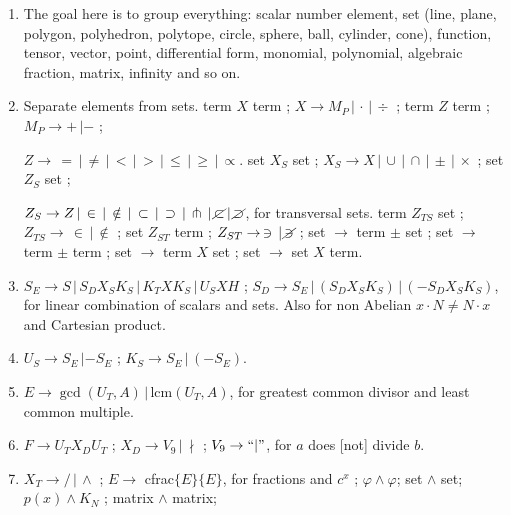 \documentclass[11pt,a4paper]{article}
\newenvironment{myenum}
{ \begin{enumerate}
    \setlength{\itemsep}{0pt}
    \setlength{\parskip}{0pt}
    \setlength{\parsep}{0pt}     }
{ \end{enumerate}                  }
\begin{document}
		\begin{myenum}
		\item The goal here is to group everything: scalar number element, set (line, plane, polygon, polyhedron, polytope, circle, sphere, ball, cylinder, cone), function, tensor, vector, point, differential form, monomial, polynomial, algebraic fraction, matrix, infinity and so on.
		\item Separate elements from sets. term $X$ term ; $X \rightarrow M_P\,|\,\cdot\,|\,\div$ ; term $Z$ term ; $M_P \rightarrow +\,|-$ ;

		$Z \rightarrow\,=\,|\,\ne\,|\,<\,|\,>\,|\,\le\,|\,\ge\,|\,\propto$. set $X_S$ set ; $X_S \rightarrow X\,|\,\cup\,|\,\cap\,|\,\pm\,|\,\times$ ; set $Z_S$ set ;

		$Z_S \rightarrow Z\,|\,\in\,|\,\notin\,|\,\subset\,|\,\supset\,|\,\pitchfork\,|\,\cancel{\subset}\,|\,\cancel{\supset}$, for transversal sets. term $Z_{TS}$ set ; $Z_{TS} \rightarrow\,\in\,|\,\notin$ ; set $Z_{ST}$ term ; $Z_{ST} \rightarrow\,\ni\,|\,\cancel{\ni}$ ; set $\rightarrow$ term $\pm$ set ; set $\rightarrow$ term $\pm$ term ; set $\rightarrow$ term $X$ set ; set $\rightarrow$ set $X$ term.
		\item $S_E \rightarrow S\,|\,S_DX_SK_S\,|\,K_T X K_S\,|\,U_S X H$ ; $S_D \rightarrow S_E\,|\,(S_DX_SK_S)\,|\,(-S_DX_SK_S)$, for linear combination of scalars and sets. Also for non Abelian $x \cdot N \ne N \cdot x$ and Cartesian product.
		\item $U_S \rightarrow S_E\,| -S_E$ ; $K_S \rightarrow S_E\,|\,(-S_E)$.
		\item $E \rightarrow \gcd(U_T, A)\,|\,$lcm$(U_T, A)$, for greatest common divisor and least common multiple.
		\item $F \rightarrow U_TX_DU_T$ ; $X_D \rightarrow V_9\,|\,\nmid$ ; $V_9 \rightarrow ``|"$, for $a$ does [not] divide $b$.
		\item $X_T \rightarrow /\,|\,\wedge$ ; $E \rightarrow$ cfrac$\{E\}\{E\}$, for fractions and $c^x$ ; $\varphi\wedge\varphi$; set $\wedge$ set; $p(x)\wedge K_N$ ; matrix $\wedge$ matrix;


\end{myenum}
\end{document}
